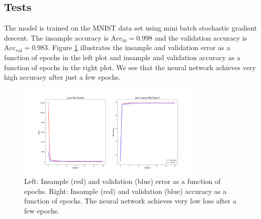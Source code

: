 \documentclass{article}
\begin{document}
\subsection*{Tests}
The model is trained on the MNIST data set using mini batch stochastic gradient descent. The insample accuracy is $\mathrm{Acc}_\mathrm{in} = 0.998$ and the validation accuracy is $\mathrm{Acc}_\mathrm{val} = 0.983$. 
Figure \ref{fig:error} illustrates the insample and validation error as a function of epochs in the left plot and insample and validation accuracy as a function of epochs in the right plot.
We see that the neural network achieves very high accuracy after just a few epochs.
\begin{figure}
	\centering
	\includegraphics[width=0.8\textwidth]{results/epoch_plots.png}
	\caption{
		Left: Insample (red) and validation (blue) error as a function of epochs. 
		Right: Insample (red) and validation (blue) accuracy as a function of epochs.
		The neural network achieves very low loss after a few epochs.
	}
	\label{fig:error}
\end{figure}
\end{document}
